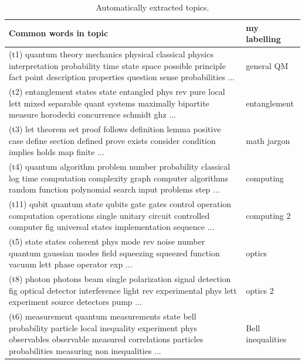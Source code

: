 \documentclass[11pt]{article}
\begin{document}
        \begin{table}
        \centering
        \caption{Automatically extracted topics.}
        \vspace{0.05in}
        \begin{footnotesize}
        \begin{raggedright}
        \begin{tabular}{|p{4.7in} p{1.2in} |}
        \hline \rule{0pt}{3ex}
        Common words in topic           & my labelling \\[3pt]
        \hline \rule{0pt}{3ex}
        (t1) quantum theory mechanics physical classical physics interpretation probability time state space
        possible principle fact point description properties question sense probabilities ...
        & general QM \\

        (t2) entanglement states state entangled phys rev pure local lett mixed separable quant systems
        maximally bipartite measure horodecki concurrence schmidt ghz ...
        & entanglement \\
        (t3) let theorem set proof follows definition lemma positive case define section defined prove
        exists consider condition implies holds map finite ...
        & math jargon \\

        (t4) quantum algorithm problem number probability classical log time computation complexity graph
        computer algorithms random function polynomial search input problems step ...
        & computing \\
        (t11) qubit quantum state qubits gate gates control operation computation operations single unitary
        circuit controlled computer fig universal states implementation sequence ...
        & computing 2 \\

        (t5) state states coherent phys mode rev noise number quantum gaussian modes field squeezing
        squeezed function vacuum lett phase operator exp ...
        & optics \\
        (t8) photon photons beam single polarization signal detection fig optical detector interference
        light rev experimental phys lett experiment source detectors pump ...
        & optics 2 \\

        (t6) measurement quantum measurements state bell probability particle local inequality experiment
        phys observables observable measured correlations particles probabilities measuring non inequalities
        ...
        & Bell inequalities \\


\end{tabular}
\end{raggedright}
\end{footnotesize}
\end{table}
\end{document}

